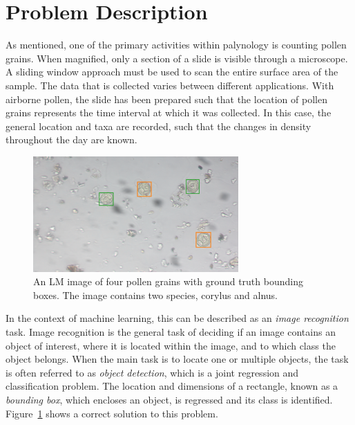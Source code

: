 \section{Problem Description}\label{sec:back-problem}
As mentioned, one of the primary activities within palynology is counting pollen grains.
When magnified, only a section of a slide is visible through a microscope.
A sliding window approach must be used to scan the entire surface area of the sample.
The data that is collected varies between different applications.
With airborne pollen, the slide has been prepared such that the location of pollen grains represents the time interval at which it was collected.
In this case, the general location and taxa are recorded, such that the changes in density throughout the day are known.

\begin{figure}[htbp]
  \centering
  \includegraphics[width=0.7\textwidth]{figs/background/GT-Snap-080.png}
  \caption[Bounding boxes]{An LM image of four pollen grains with ground truth bounding boxes.
The image contains two species, \textcolor{corylus}{corylus} and \textcolor{alnus}{alnus}.}\label{fig:bbox}
\end{figure}

In the context of machine learning, this can be described as an \textit{image recognition} task.
Image recognition is the general task of deciding if an image contains an object of interest, where it is located within the image, and to which class the object belongs.
When the main task is to locate one or multiple objects, the task is often referred to as \textit{object detection}, which is a joint regression and classification problem.
The location and dimensions of a rectangle, known as a \textit{bounding box}, which encloses an object, is regressed and its class is identified.
Figure~\ref{fig:bbox} shows a correct solution to this problem.

